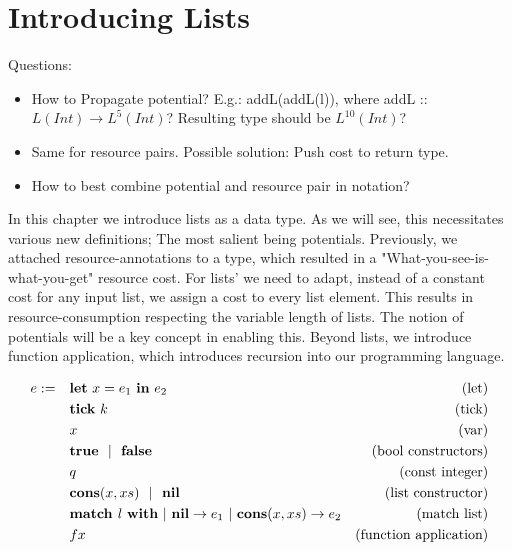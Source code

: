 \chapter{Introducing Lists}

Questions:
\begin{itemize}
   \item How to Propagate potential? E.g.: addL(addL(l)), where addL :: \(L(Int) \to L^5(Int)\)? Resulting type should be \(L^{10}(Int)\)?
   \item Same for resource pairs. Possible solution: Push cost to return type.
   \item How to best combine potential and resource pair in notation? 
\end{itemize}

In this chapter we introduce lists as a data type. As we will see, this necessitates various new definitions; The most salient being potentials. Previously, we attached resource-annotations to a type, which resulted in a "What-you-see-is-what-you-get" resource cost. For lists' we need to adapt, instead of a constant cost for any input list, we assign a cost to every list element. This results in resource-consumption respecting the variable length of lists. The notion of potentials will be a key concept in enabling this. Beyond lists, we introduce function application, which introduces recursion into our programming language. 

\begin{definition}
   \label{def:prog-lang-6}

\begin{align*}
   e := ~~~ & \mathbf{let}~x = e_1~\mathbf{in}~e_2		& \text{(let)}\\
            & \mathbf{tick}~k				& \text{(tick)}\\
	    & x					& \text{(var)}\\
	    & \mathbf{true} ~~| ~~\mathbf{false}		& \text{(bool constructors)}\\
	    & q					& \text{(const integer)}\\
            & \textbf{cons}(x, xs) ~~| ~~ \textbf{nil}      & \text{(list constructor)}\\
            & \textbf{match } l~\textbf{with}~|~\textbf{nil} \to e_1~|~\textbf{cons}(x, xs) \to e_2           & \text{(match list)}\\
            & f x                               & \text{(function application)}\\
\end{align*}
\end{definition}

